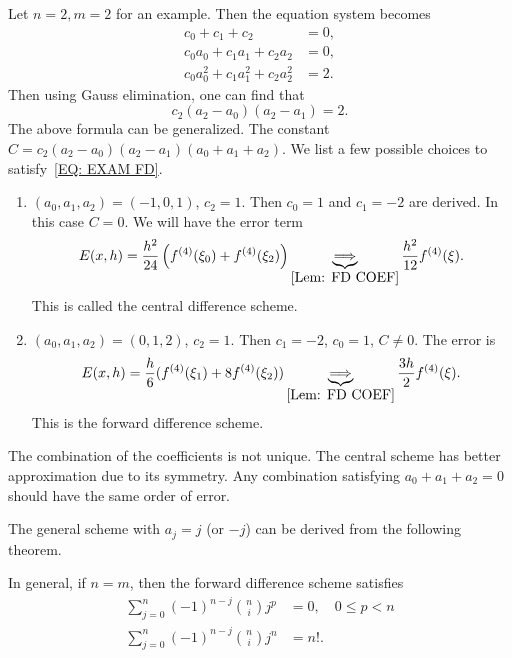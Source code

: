\begin{example}
    Let $n = 2, m = 2$ for an example. Then the equation system becomes \begin{equation}\label{EQ: EXAM FD}
        \begin{aligned}
            c_0  + c_1  + c_2  &= 0, \\
            c_0 a_0 + c_1 a_1 + c_2 a_2 &= 0, \\
            c_0 a_0^2 + c_1 a_1^2 + c_2 a_2^2 &= 2.  
        \end{aligned}
    \end{equation}
    Then using Gauss elimination, one can find that 
    $$c_2 (a_2 - a_0) (a_2 - a_1) = 2.$$
    The above formula can be generalized. The constant $C = c_2(a_2 - a_0)(a_2 - a_1) (a_0 + a_1 + a_2)$. We list a few possible choices to satisfy~\eqref{EQ: EXAM FD}. 
    \begin{enumerate}
        \item $(a_0, a_1, a_2) = (-1, 0, 1)$, $c_2 = 1$. Then $c_0 = 1$ and $c_1 = -2$ are derived. In this case $C = 0$. We will have the error term 
        $$E(x, h) = \frac{h^2}{24}\left(f^{(4)}(\xi_0) + f^{(4)}(\xi_2)\right) \underbrace{\Longrightarrow }_{\ref{Lem: FD COEF}} \frac{h^2}{12} f^{(4)}(\xi).$$
        This is called the central difference scheme.
        \item $(a_0, a_1, a_2) = (0, 1, 2)$, $c_2 = 1$. Then $c_1 = -2$, $c_0 = 1$,  $C \neq 0$. The error is 
        $$E(x, h) = \frac{h}{6} (f^{(4)}(\xi_1) + 8 f^{(4)}(\xi_2)) \underbrace{\Longrightarrow }_{\ref{Lem: FD COEF}} \frac{3h}{2} f^{(4)}(\xi).$$
        This is the forward difference scheme.
    \end{enumerate}
    The combination of the coefficients is not unique. The central scheme has better approximation due to its symmetry. Any combination satisfying $a_0 + a_1 + a_2 = 0$ should have the same order of error.
\end{example}
The general scheme with $a_j = j$ (or $-j$) can be derived from the following theorem.
\begin{theorem}\label{THM: FWD DIFF}
    In general, if $n = m$, then the forward difference scheme satisfies 
    \begin{equation}
        \begin{aligned}
            \sum_{j=0}^n (-1)^{n-j} \binom{n}{i} j^p &= 0,\quad 0\le p < n \\
            \sum_{j=0}^n (-1)^{n-j} \binom{n}{i} j^n &= n!.   
        \end{aligned}
    \end{equation}
\end{theorem}
